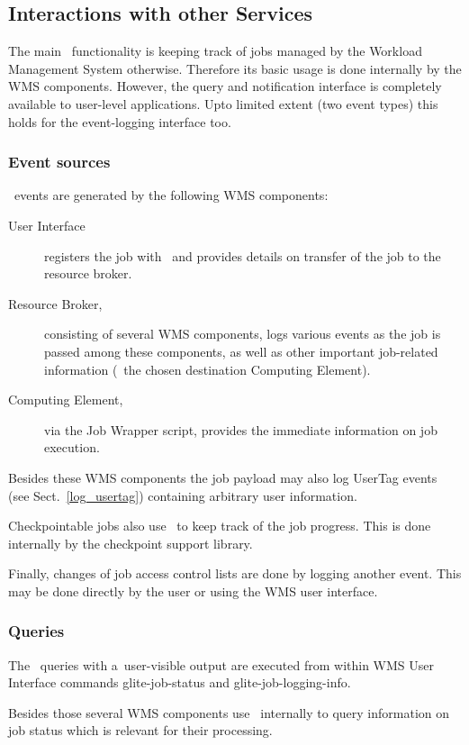 \subsection{Interactions with other Services}

The main \LB\ functionality is keeping track of jobs managed by
the Workload Management System otherwise.
Therefore its basic usage is done internally by the WMS components.
However, the query and notification interface is completely available
to user-level applications. Upto limited extent (two event types)
this holds for the event-logging interface too.

\subsubsection{Event sources}
\LB\ events are generated by the following WMS components:
\begin{description}
\item[User Interface] registers the job with \LB\ and provides details
on transfer of the job to the resource broker.
\item[Resource Broker,] consisting of several WMS components,
logs various events as the job is passed among these components, 
as well as other important job-related information (\eg\ the chosen
destination Computing Element).
\item[Computing Element,] via the Job Wrapper script, provides the immediate
information on job execution.
\end{description}
Besides these WMS components the job payload may also log UserTag events
(see Sect.~\ref{log_usertag}) containing arbitrary user information.

Checkpointable jobs also use \LB\ to keep track of the job progress.
This is done internally by the checkpoint support library.

Finally, changes of job access control lists are done by logging
another event. This may be done directly by the user or using the WMS
user interface.

\subsubsection{Queries}

The \LB\ queries with a~user-visible output
are executed from within WMS User Interface
commands glite-job-status and glite-job-logging-info.

Besides those several WMS components use \LB\ internally to query
information on job status which is relevant for their processing.

